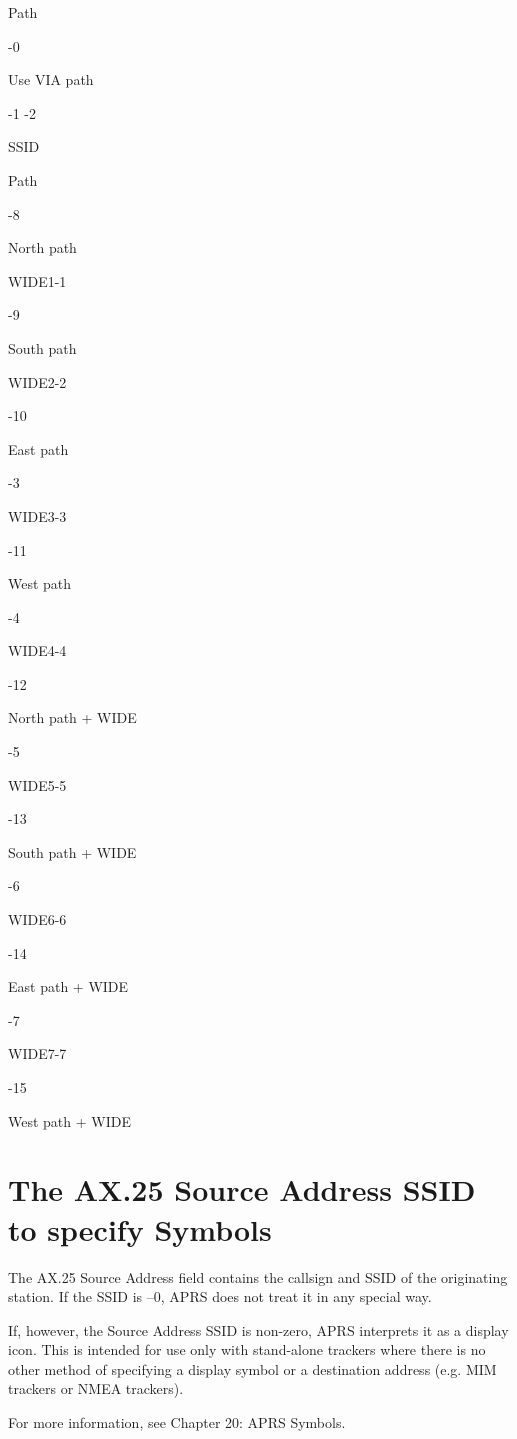 Path

-0

Use VIA path

-1
-2

SSID

Path

-8

North path

WIDE1-1

-9

South path

WIDE2-2

-10

East path

-3

WIDE3-3

-11

West path

-4

WIDE4-4

-12

North path + WIDE

-5

WIDE5-5

-13

South path + WIDE

-6

WIDE6-6

-14

East path + WIDE

-7

WIDE7-7

-15

West path + WIDE


\section{The AX.25 Source Address SSID to specify Symbols}

The AX.25 Source Address field contains the callsign and SSID of the
originating station. If the SSID is –0, APRS does not treat it in any special
way.

If, however, the Source Address SSID is non-zero, APRS interprets it as a
display icon. This is intended for use only with stand-alone trackers where
there is no other method of specifying a display symbol or a destination
address (e.g. MIM trackers or NMEA trackers).

For more information, see Chapter 20: APRS Symbols.
